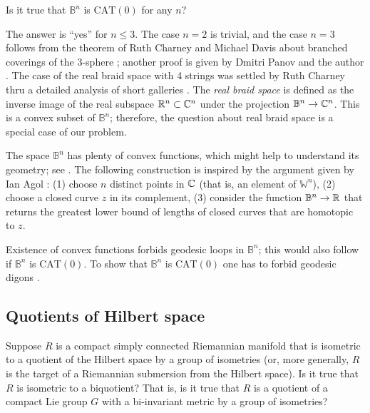 \begin{pr}
Is it true that $\mathbb{B}^n$ is $\mathrm{CAT}(0)$ for any $n$?
\end{pr}

The answer is ``yes'' for $n\le 3$.
The case $n=2$ is trivial, and the case $n=3$ follows from the theorem of Ruth Charney and Michael Davis about branched coverings of the 3-sphere \cite{charney-davis};
another proof is given by Dmitri Panov and the author \cite{panov-petrunin-ramification}.
The case of the real braid space with 4 strings was settled by Ruth Charney thru a detailed analysis of
short galleries \cite[Theorem~5.4]{charney2004}.
The \emph{real braid space} is defined as the inverse image of the real subspace $\mathbb{R}^n\subset \mathbb{C}^n$ under the projection $\mathbb{B}^n\to \mathbb{C}^n$.
This is a convex subset of  $\mathbb{B}^n$; therefore, the question about real braid space is a special case of our problem.

The space $\mathbb{B}^n$ has plenty of convex functions, which might help to understand its geometry; see \cite{panov-petrunin2026}.
The following construction is inspired by the argument given by Ian Agol \cite{agol-braid}:
(1) choose $n$ distinct points in $\mathbb{C}$ (that is, an element of $\mathbb{W}^n$),
(2) choose a closed curve $z$ in its complement,
(3) consider the function $\mathbb{B}^n\to \mathbb{R}$  that returns the greatest lower bound of lengths of closed curves that are homotopic to $z$.

Existence of convex functions forbids geodesic loops in $\mathbb{B}^n$; this would also follow if $\mathbb{B}^n$ is $\mathrm{CAT}(0)$.
To show that $\mathbb{B}^n$ is $\mathrm{CAT}(0)$ one has to forbid geodesic digons \cite[6.6]{AKP-invitation-2}.

\subsection{Quotients of Hilbert space}

\begin{pr} Suppose $R$ is a compact simply connected Riemannian manifold that is isometric to a quotient of the Hilbert space by a group of isometries (or, more generally, $R$ is the target of a Riemannian submersion from the Hilbert space).
Is it true that $R$ is isometric to a biquotient?
That is, is it true that $R$ is a quotient of a compact Lie group $G$ with a bi-invariant metric by a group of isometries?

\end{pr}

